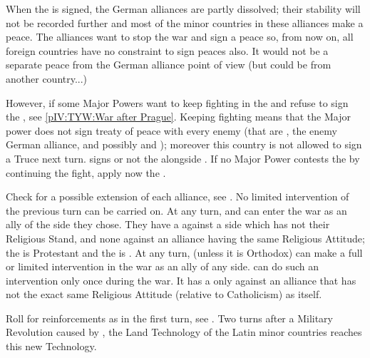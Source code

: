 \bparag When the  is signed, the German
alliances are partly dissolved; their stability will not be recorded further
and most of the minor countries in these alliances make a peace.  The
alliances want to stop the war and sign a peace so, from now on, all foreign
countries have no constraint to sign peaces also. It would not be a separate
peace from the German alliance point of view (but could be from another
country...)

\bparag However, if some Major Powers want to keep fighting in the \HRE and
refuse to sign the , see \ref{pIV:TYW:War after
  Prague}. Keeping fighting means that the Major power does not sign treaty of
peace with every enemy (that are \MAJ, the enemy German alliance, and possibly
\HOLmin and \DANmin); moreover this country is not allowed to sign a Truce
next turn. \AUSMin signs or not the  alongside
\SPA.
\bparag If no Major Power contests the  by
continuing the fight, apply now the .


\phevnt
\aparag Check for a possible extension of each alliance, see
.
\aparag No limited intervention of the previous turn can be carried on.
\aparag At any turn, \FRA and \ENG can enter the war as an ally of the side
they chose. They have a \CB against a side which has not their Religious
Stand, and none against an alliance having the same Religious Attitude; the
\alliance is Protestant and the \ligue is \CATHCR.
\aparag At any turn, \POL (unless it is Orthodox) can make a full or limited
intervention in the war as an ally of any side. \POL can do such an
intervention only once during the war. It has a \CB only against an alliance
that has not the exact same Religious Attitude (relative to Catholicism) as
itself.

\phadm
\aparag Roll for reinforcements as in the first turn, see
.
\aparag Two turns after a Military Revolution caused by \SUE, the Land
Technology of the Latin minor countries reaches this new Technology.

